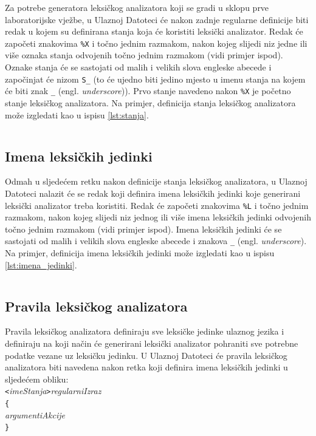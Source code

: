 \documentclass[times, 12pt, utf8]{book}
\begin{document}
Za potrebe generatora leksičkog analizatora koji se gradi u sklopu prve laboratorijske vježbe, u Ulaznoj Datoteci će nakon zadnje regularne definicije biti redak u kojem su definirana stanja koja će koristiti leksički analizator.
Redak će započeti znakovima \verb=%X= i točno jednim razmakom, nakon kojeg slijedi niz jedne ili više oznaka stanja odvojenih točno jednim razmakom (vidi primjer ispod).
Oznake stanja će se sastojati od malih i velikih slova engleske abecede i započinjat će nizom \verb=S_= (to će ujedno biti jedino mjesto u imenu stanja na kojem će biti znak \verb=_= (engl. \emph{underscore})).
Prvo stanje navedeno nakon \verb=%X= je početno stanje leksičkog analizatora.
Na primjer, definicija stanja leksičkog analizatora može izgledati kao u ispisu \ref{lst:stanja}.

\begin{lstlisting}[caption={Primjer imena stanja u Ulaznoj Datoteci.},label=lst:stanja]
%X S_pocetno S_komentar S_unarniMinus
\end{lstlisting}

\subsection{Imena leksičkih jedinki}
Odmah u sljedećem retku nakon definicije stanja leksičkog analizatora, u Ulaznoj Datoteci nalazit će se redak koji definira imena leksičkih jedinki koje generirani leksički analizator treba koristiti.
Redak će započeti znakovima \verb=%L= i točno jednim razmakom, nakon kojeg slijedi niz jednog ili više imena leksičkih jedinki odvojenih točno jednim razmakom (vidi primjer ispod).
Imena leksičkih jedinki će se sastojati od malih i velikih slova engleske abecede i znakova \verb=_= (engl. \emph{underscore}).
Na primjer, definicija imena leksičkih jedinki može izgledati kao u ispisu \ref{lst:imena_jedinki}.

\begin{lstlisting}[caption={Primjer imena stanja u Ulaznoj Datoteci.},label=lst:imena_jedinki]
%L IDENTIFIKATOR brojcanaKonstanta znakovnaKonstanta OP_PLUS
\end{lstlisting}

\subsection{Pravila leksičkog analizatora}
Pravila leksičkog analizatora definiraju sve leksičke jedinke ulaznog jezika i definiraju na koji način će generirani leksički analizator pohraniti sve potrebne podatke vezane uz leksičku jedinku.
U Ulaznoj Datoteci će pravila leksičkog analizatora biti navedena nakon retka koji definira imena leksičkih jedinki u sljedećem obliku:\\
\verb=<=\emph{imeStanja}\verb=>=\emph{regularniIzraz}\\
\verb|{|\\
\emph{argumentiAkcije}\\
\verb|}|
\end{document}
